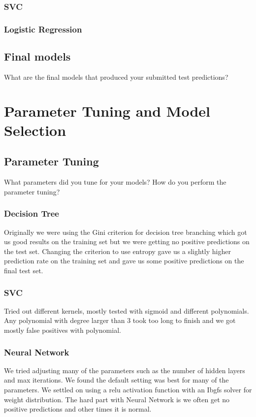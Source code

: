 \documentclass[11pt,a4paper]{article}
\begin{document}
		\subsubsection{SVC}

		\subsubsection{Logistic Regression}

	\subsection{Final models}
		What are the final models that produced your submitted test predictions?

\section{Parameter Tuning and Model Selection }
	\subsection{Parameter Tuning}
		What parameters did you tune for your models? How do you perform the parameter tuning?

		\subsubsection{Decision Tree}
			Originally we were using the Gini criterion for decision tree branching which got us good results on the training set but we were getting no positive predictions on the test set.
			Changing the criterion to use entropy gave us a slightly higher prediction rate on the training set and gave us some positive predictions on the final test set.

		\subsubsection{SVC}
			Tried out different kernels, mostly tested with sigmoid and different polynomials.
			Any polynomial with degree larger than 3 took too long to finish and we got mostly false positives with polynomial.

		\subsubsection{Neural Network}
			We tried adjusting many of the parameters such as the number of hidden layers and max iterations.
			We found the default setting was best for many of the parameters.
			We settled on using a relu activation function with an Ibgfs solver for weight distribution.
			The hard part with Neural Network is we often get no positive predictions and other times it is normal.
\end{document}

